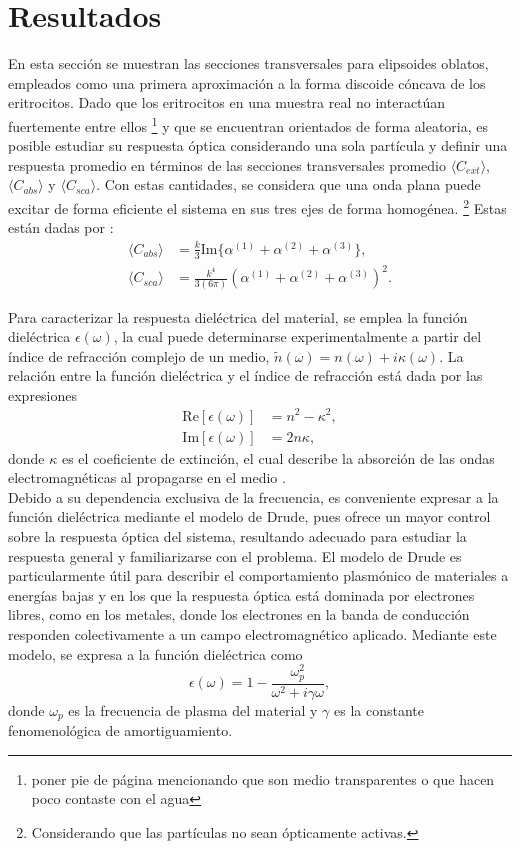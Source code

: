 \section{Resultados}
En esta sección se muestran las secciones transversales para elipsoides oblatos, empleados como una primera aproximación a la forma discoide cóncava de los eritrocitos. Dado que los eritrocitos en una muestra real no interactúan fuertemente entre ellos \footnote{poner pie de página mencionando que son medio transparentes o que hacen poco contaste con el agua} y que se encuentran orientados de forma aleatoria, es posible estudiar su respuesta óptica considerando una sola partícula y definir una respuesta promedio en términos de las secciones transversales promedio $\langle C_{ext} \rangle$, $\langle C_{abs} \rangle$ y $\langle C_{sca} \rangle$. Con estas cantidades, se considera que una onda plana puede excitar de forma eficiente el sistema en sus tres ejes de forma homogénea. \footnote{Considerando que las partículas no sean ópticamente activas.} Estas están dadas por \cite{Bohren}:
\begin{align*}
	\langle C_{abs}\rangle &= \frac{k}{3} \text{Im}\{\alpha^{(1)}+\alpha^{(2)}+\alpha^{(3)}\},\\
	\langle C_{sca}\rangle &= \frac{k^4}{3(6\pi)} \left(\alpha^{(1)}+\alpha^{(2)}+\alpha^{(3)}\right)^2.
\end{align*}

Para caracterizar la respuesta dieléctrica del material, se emplea la función dieléctrica $\epsilon(\omega)$, la cual puede determinarse experimentalmente a partir del índice de refracción complejo de un medio, $\tilde{n}(\omega) = n(\omega) + i\kappa(\omega)$. La relación entre la función dieléctrica y el índice de refracción está dada por las expresiones \cite{Plasmonics}
\begin{align} 
	\text{Re}[\epsilon(\omega)] &= n^2 - \kappa^2,\\
	\text{Im}[\epsilon(\omega)] &= 2n\kappa, \end{align}
donde $\kappa$ es el coeficiente de extinción, el cual describe la absorción de las ondas electromagnéticas al propagarse en el medio \cite{Plasmonics}.\\

Debido a su dependencia exclusiva de la frecuencia, es conveniente expresar a la función dieléctrica mediante el modelo de Drude, pues ofrece un mayor control sobre la respuesta óptica del sistema, resultando adecuado para estudiar la respuesta general y familiarizarse con el problema. El modelo de Drude es particularmente útil para describir el comportamiento plasmónico de materiales a energías bajas y en los que la respuesta óptica está dominada por electrones libres, como en los metales, donde los electrones en la banda de conducción responden colectivamente a un campo electromagnético aplicado. Mediante este modelo, se expresa a la función dieléctrica como \cite{Plasmonics}
\begin{equation} \epsilon(\omega) = 1 - \frac{\omega_p^2}{\omega^2 + i\gamma\omega}, \end{equation}
donde $\omega_p$ es la frecuencia de plasma del material y $\gamma$ es la constante fenomenológica de amortiguamiento. \\

